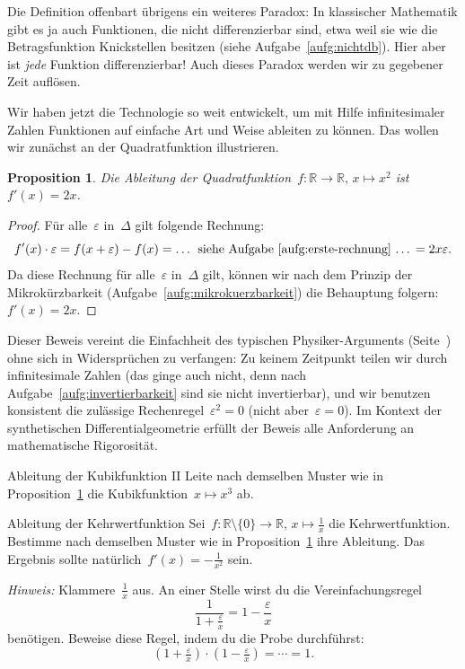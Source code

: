 \documentclass[twoside]{../zirkelblatt}
\newcommand{\RR}{\mathbb{R}}
\theoremstyle{definition}
\theoremstyle{plain}
\newtheorem{prop}[defn]{Proposition}
\theoremstyle{remark}
\begin{document}
Die\marginpar[\hfill\dbend]{\dbend} Definition offenbart übrigens ein weiteres Paradox: In klassischer
Mathematik gibt es ja auch Funktionen, die nicht differenzierbar sind, etwa
weil sie wie die Betragsfunktion Knickstellen besitzen (siehe
Aufgabe~\ref{aufg:nichtdb}). Hier aber ist \emph{jede}
Funktion differenzierbar! Auch dieses Paradox werden wir zu gegebener Zeit
auflösen.

Wir haben jetzt die Technologie so weit entwickelt, um mit Hilfe
infinitesimaler Zahlen Funktionen auf einfache Art und Weise ableiten zu
können. Das wollen wir zunächst an der Quadratfunktion illustrieren.

\begin{prop}\label{prop:ableitung-quadratfunktion-sdg}
Die Ableitung der Quadratfunktion~$f : \RR \to \RR,\,x \mapsto x^2$
ist~$f'(x) = 2x$.\end{prop}
\begin{proof}Für alle~$\varepsilon$ in~$\Delta$ gilt folgende Rechnung:
\[ f'(x) \cdot \varepsilon =
  f(x + \varepsilon) - f(x) =
  \text{\ldots{} siehe Aufgabe~\ref{aufg:erste-rechnung} \ldots} =
  2x\varepsilon. \]
Da diese Rechnung für alle~$\varepsilon$ in~$\Delta$ gilt, können wir nach dem
Prinzip der Mikrokürzbarkeit (Aufgabe~\ref{aufg:mikrokuerzbarkeit}) die
Behauptung folgern: $f'(x) = 2x$.
\end{proof}

Dieser Beweis vereint die Einfachheit des typischen Physiker-Arguments
(Seite~\pageref{par:schizophren}) ohne sich in Widersprüchen zu verfangen: Zu
keinem Zeitpunkt teilen wir durch infinitesimale Zahlen (das ginge auch nicht,
denn nach Aufgabe~\ref{aufg:invertierbarkeit} sind sie nicht invertierbar), und
wir benutzen konsistent die zulässige Rechenregel~$\varepsilon^2 = 0$ (nicht
aber~$\varepsilon = 0$). Im Kontext der synthetischen Differentialgeometrie
erfüllt der Beweis alle Anforderung an mathematische Rigorosität.

\begin{aufgabeShaded}{Ableitung der Kubikfunktion II}
Leite nach demselben Muster wie in
Proposition~\ref{prop:ableitung-quadratfunktion-sdg} die Kubikfunktion~$x
\mapsto x^3$ ab.
\end{aufgabeShaded}

\begin{aufgabeShaded}{Ableitung der Kehrwertfunktion}
Sei~$f : \RR \setminus \{0\} \to \RR,\,x \mapsto \frac{1}{x}$ die
Kehrwertfunktion. Bestimme nach demselben Muster wie in
Proposition~\ref{prop:ableitung-quadratfunktion-sdg} ihre Ableitung.
Das Ergebnis sollte natürlich~$f'(x) = -\frac{1}{x^2}$ sein.

\emph{Hinweis:} Klammere~$\frac{1}{x}$ aus. An einer Stelle wirst du die Vereinfachungsregel
\[ \frac{1}{1 + \frac{\varepsilon}{x}} = 1 - \frac{\varepsilon}{x} \]
benötigen.\footnotemark{}
Beweise diese Regel, indem du die Probe durchführst:
\[ (1 + \tfrac{\varepsilon}{x}) \cdot (1 - \tfrac{\varepsilon}{x}) = \cdots = 1. \]
\end{aufgabeShaded}
\end{document}
